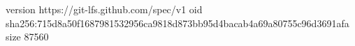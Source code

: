 version https://git-lfs.github.com/spec/v1
oid sha256:715d8a50f1687981532956ca9818d873bb95d4bacab4a69a80755c96d3691afa
size 87560
